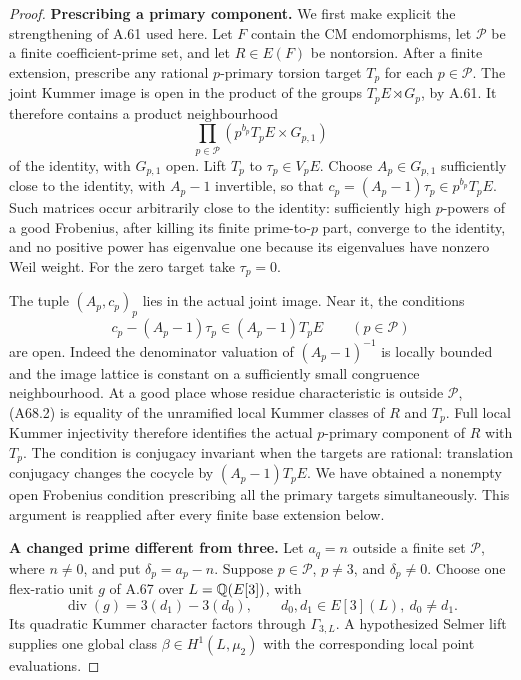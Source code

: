 \begin{proof}
\par\smallskip\noindent\textbf{Prescribing a primary component.}\enspace 
We first make explicit the strengthening
of A.61 used here. Let $F$ contain the
CM endomorphisms, let $\mathcal P$ be a
finite coefficient-prime set, and let
$R\in E(F)$ be nontorsion. After a finite
extension, prescribe any rational
$p$-primary torsion target $T_p$ for
each $p\in\mathcal P$.
The joint Kummer image is open in the
product of the groups
$T_pE\rtimes G_p$, by A.61. It therefore
contains a product neighbourhood
\[
 \prod_{p\in\mathcal P}
        (p^{b_p}T_pE\times G_{p,1})
 \tag{A68.1}
\]
of the identity, with $G_{p,1}$ open.
Lift $T_p$ to $\tau_p\in V_pE$.
Choose $A_p\in G_{p,1}$ sufficiently
close to the identity, with $A_p-1$
invertible, so that
$c_p=(A_p-1)\tau_p\in p^{b_p}T_pE$.
Such matrices occur arbitrarily close
to the identity: sufficiently high
$p$-powers of a good Frobenius, after
killing its finite prime-to-$p$ part,
converge to the identity, and no
positive power has eigenvalue one
because its eigenvalues have nonzero
Weil weight. For the zero target
take $\tau_p=0$.

The tuple $(A_p,c_p)_p$ lies in
the actual joint image. Near it,
the conditions
\[
 c_p-(A_p-1)\tau_p\in(A_p-1)T_pE
                   \qquad(p\in\mathcal P)
 \tag{A68.2}
\]
are open. Indeed the denominator
valuation of $(A_p-1)^{-1}$ is
locally bounded and the image
lattice is constant on a sufficiently
small congruence neighbourhood.
At a good place whose residue
characteristic is outside
$\mathcal P$, (A68.2) is equality
of the unramified local Kummer
classes of $R$ and $T_p$.
Full local Kummer injectivity
therefore identifies the actual
$p$-primary component of $R$
with $T_p$. The condition is
conjugacy invariant when the
targets are rational: translation
conjugacy changes the cocycle by
$(A_p-1)T_pE$. We have obtained
a nonempty open Frobenius condition
prescribing all the primary targets
simultaneously. This argument is
reapplied after every finite base
extension below.

\par\smallskip\noindent\textbf{A changed prime different from three.}\enspace 
Let $a_q=n$ outside a finite set
$\mathcal P$, where $n\ne0$, and
put $\delta_p=a_p-n$. Suppose
$p\in\mathcal P$, $p\ne3$, and
$\delta_p\ne0$. Choose one flex-ratio
unit $g$ of A.67 over
$L=\mathbb Q(E[3])$, with
\[
 \operatorname{div}(g)=3(d_1)-3(d_0),
              \qquad d_0,d_1\in E[3](L),\ d_0\ne d_1.
 \tag{A68.3}
\]
Its quadratic Kummer character
factors through $\Gamma_{3,L}$.
A hypothesized Selmer lift supplies
one global class $\beta\in
H^1(L,\mu_2)$ with the corresponding
local point evaluations.


\end{proof}
